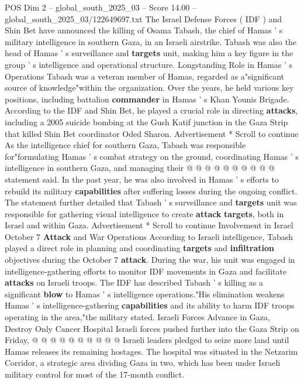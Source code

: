 \begin{textsample}{POS Dim 2 – global\_south\_2025\_03 – Score 14.00 – global\_south\_2025\_03/122649697.txt}  \label{ex:f2_pos_289}
The Israel Defense Forces ( IDF ) and Shin Bet have announced the killing of Osama Tabash, the chief of Hamas ' s military intelligence in southern Gaza, in an Israeli airstrike.
Tabash was also the head of Hamas ' s surveillance and \textbf{targets} unit, making him a key figure in the group ' s intelligence and operational structure.
Longstanding Role in Hamas ' s Operations Tabash was a veteran member of Hamas, regarded as a"significant source of knowledge"within the organization.
Over the years, he held various key positions, including battalion \textbf{commander} in Hamas ' s Khan Younis Brigade.
According to the IDF and Shin Bet, he played a crucial role in directing \textbf{attacks}, including a 2005 suicide bombing at the Gush Katif junction in the Gaza Strip that killed Shin Bet coordinator Oded Sharon.
Advertisement * Scroll to continue As the intelligence chief for southern Gaza, Tabash was responsible for"formulating Hamas ' s combat strategy on the ground, coordinating Hamas ' s intelligence in southern Gaza, and managing their @ @ @ @ @ @ @ @ @ @ statement said.
In the past year, he was also involved in Hamas ' s efforts to rebuild its military \textbf{capabilities} after suffering losses during the ongoing conflict.
The statement further detailed that Tabash ' s surveillance and \textbf{targets} unit was responsible for gathering visual intelligence to create \textbf{attack} \textbf{targets}, both in Israel and within Gaza.
Advertisement * Scroll to continue Involvement in Israel October 7 \textbf{Attack} and War Operations According to Israeli intelligence, Tabash played a direct role in planning and coordinating \textbf{targets} and \textbf{infiltration} objectives during the October 7 \textbf{attack}.
During the war, his unit was engaged in intelligence-gathering efforts to monitor IDF movements in Gaza and facilitate \textbf{attacks} on Israeli troops.
The IDF has described Tabash ' s killing as a significant \textbf{blow} to Hamas ' s intelligence operations."His elimination weakens Hamas ' s intelligence-gathering \textbf{capabilities} and its ability to harm IDF troops operating in the area,"the military stated.
Israeli Forces Advance in Gaza, Destroy Only Cancer Hospital Israeli forces pushed further into the Gaza Strip on Friday, @ @ @ @ @ @ @ @ @ @ Israeli leaders pledged to seize more land until Hamas releases its remaining hostages.
The hospital was situated in the Netzarim Corridor, a strategic area dividing Gaza in two, which has been under Israeli military control for most of the 17-month conflict.

\end{textsample}

